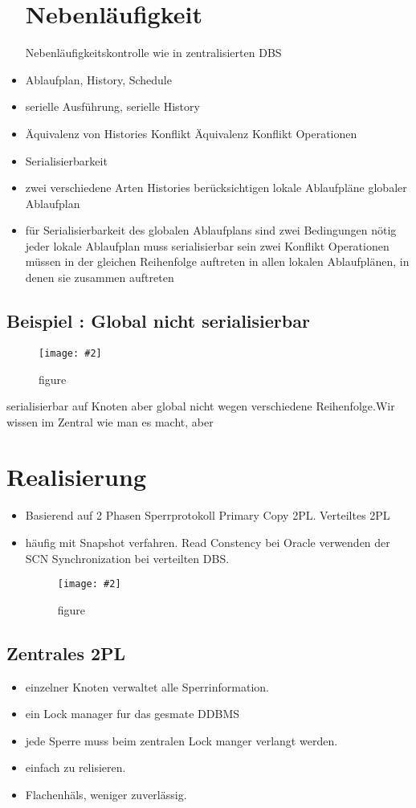 \documentclass[a4paper,10pt,titlepage=false]{scrreprt}
\newcommand{\pic}[2][figure]{\begin{figure}[h]
 \centering
 \texttt{[image: \#2]}
 \caption{#1}
\end{figure}
}
\begin{document}
\begin{itemize}
\section{Nebenläufigkeit}
Nebenläufigkeitskontrolle wie in zentralisierten DBS
\item Ablaufplan, History, Schedule
\item serielle Ausführung, serielle History
\item Äquivalenz von Histories
\subitem Konflikt Äquivalenz
\subitem Konflikt Operationen
\item Serialisierbarkeit
\item zwei verschiedene Arten Histories berücksichtigen
\subitem lokale Ablaufpläne
\subitem globaler Ablaufplan
\item für Serialisierbarkeit des globalen Ablaufplans sind
zwei Bedingungen nötig
\subitem jeder lokale Ablaufplan muss serialisierbar sein
\subitem zwei Konflikt Operationen müssen in der gleichen
Reihenfolge auftreten in allen lokalen Ablaufplänen, in
denen sie zusammen auftreten
\end{itemize}

\subsection{Beispiel : Global nicht serialisierbar}
\pic{globalns.png}

serialisierbar auf Knoten aber global nicht wegen verschiedene Reihenfolge.Wir wissen im Zentral wie man es macht, aber

\section{Realisierung} %
\label{sec:realisierung}
\begin{itemize}
  \item Basierend auf 2 Phasen Sperrprotokoll
  \subitem Primary Copy 2PL.
  \subitem Verteiltes 2PL
  \item häufig mit Snapshot verfahren.
  \subitem Read Constency bei Oracle
  \subitem verwenden der SCN Synchronization bei verteilten DBS.\\
  \pic{scn.png}

\end{itemize}
\subsection{Zentrales 2PL} %
\label{sub:zentrales_2pl}
\begin{itemize}
  \item einzelner Knoten verwaltet alle Sperrinformation.
  \item ein Lock manager fur das gesmate DDBMS
  \item jede Sperre muss beim zentralen Lock manger verlangt werden.
  \item einfach zu relisieren.
  \item Flachenhäls, weniger zuverlässig.
\end{itemize}
\end{document}
